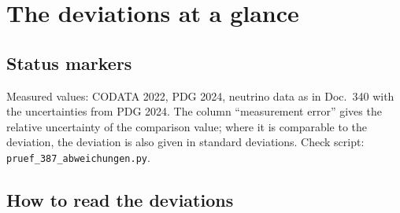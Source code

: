 
\providecommand{\BM}{\textbf{[B]}}
\providecommand{\KM}{\textbf{[K]}}
\providecommand{\SM}{\textbf{[S]}}
\providecommand{\XM}{\textbf{[X]}}
\providecommand{\QM}{\textbf{[Q]}}

\chapter*{The deviations at a glance}

\begin{abstract}
This document records all residual deviations of FFGFT in one place, each with the measured value
and its uncertainty. It follows the order of the theory: first the ratios of the basic form in
natural units with $\alpha=1$, then the translation into SI. The ratios agree to within per mille
to a few per cent; the measurement uncertainties are almost everywhere orders of magnitude smaller
than the deviations and contribute only a minimal amount. Three correction quantities carry the
residuals: the Higgs correction $\beta_T$, which already appeared in the earliest documents of 2025
as a small deviation from $\beta_T=1$, the fractal correction $K_{\text{frak}}=74/75$ of the SI
translation, and the factor~10 in $v/E_P$. For each one, the document shows which variants exist,
how well they fit and which connections arise.
\end{abstract}

\section*{Status markers}

Measured values: CODATA 2022, PDG 2024, neutrino data as in Doc.~340 with the uncertainties from
PDG 2024. The column ``measurement error'' gives the relative uncertainty of the comparison value;
where it is comparable to the deviation, the deviation is also given in standard deviations.
Check script: \texttt{pruef\_387\_abweichungen.py}.

\section{How to read the deviations}

